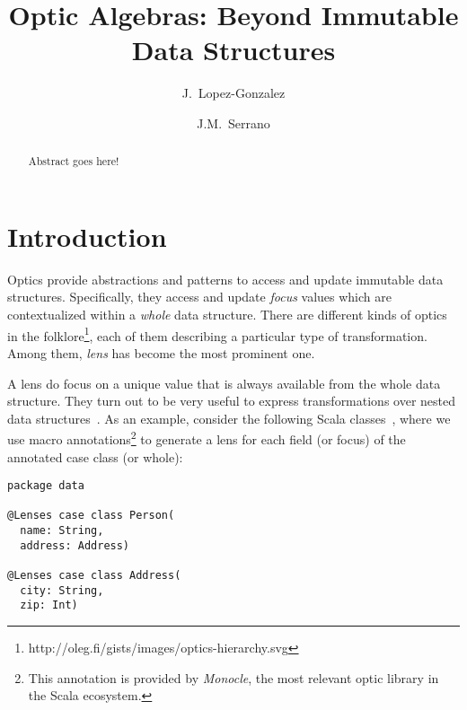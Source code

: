 \documentclass[preview, 3p]{elsarticle}
\begin{document}
\begin{frontmatter}

\title{Optic Algebras: Beyond Immutable Data Structures}

\author[urjc,habla]{J.~Lopez-Gonzalez}

\author[urjc,habla]{J.M.~Serrano}



\address[urjc]{Universidad Rey Juan Carlos}
\address[habla]{Habla Computing}

\begin{abstract}
Abstract goes here!
\end{abstract}

\end{frontmatter}


\newtheorem*{remark}{Remark}

\section{Introduction}
\label{sec:Introduction}

Optics provide abstractions and patterns to access and update immutable data
structures. Specifically, they access and update \emph{focus} values which are
contextualized within a \emph{whole} data structure. There are different kinds
of optics in the
folklore\footnote{http://oleg.fi/gists/images/optics-hierarchy.svg}, each of
them describing a particular type of transformation. Among them, \emph{lens} has
become the most prominent one.

A lens do focus on a unique value that is always available from the whole data
structure. They turn out to be very useful to express transformations over
nested data structures~\cite{foster2005combinators}. As an example, consider the
following Scala classes~\cite{odersky2004overview}, where we use macro
annotations\footnote{This annotation is provided by \emph{Monocle}, the most
relevant optic library in the Scala ecosystem.} to generate a lens for each
field (or focus) of the annotated case class (or whole):

\begin{lstlisting}
package data

@Lenses case class Person(
  name: String,
  address: Address)

@Lenses case class Address(
  city: String,
  zip: Int)
\end{lstlisting}
\end{document}
